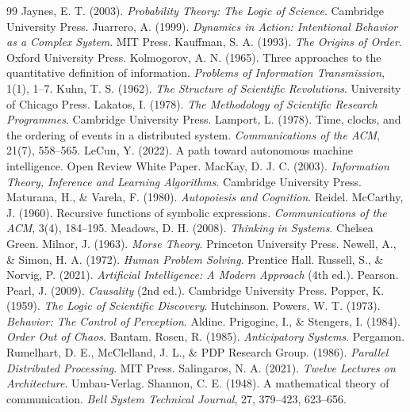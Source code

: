 \documentclass[11pt, oneside]{book}
\theoremstyle{definition}
\theoremstyle{remark}
\begin{document}
\begin{thebibliography}{99}
 Jaynes, E. T. (2003). \textit{Probability Theory: The Logic of Science}. Cambridge University Press.
 Juarrero, A. (1999). \textit{Dynamics in Action: Intentional Behavior as a Complex System}. MIT Press.
 Kauffman, S. A. (1993). \textit{The Origins of Order}. Oxford University Press.
 Kolmogorov, A. N. (1965). Three approaches to the quantitative definition of information. \textit{Problems of Information Transmission}, 1(1), 1--7.
 Kuhn, T. S. (1962). \textit{The Structure of Scientific Revolutions}. University of Chicago Press.
 Lakatos, I. (1978). \textit{The Methodology of Scientific Research Programmes}. Cambridge University Press.
 Lamport, L. (1978). Time, clocks, and the ordering of events in a distributed system. \textit{Communications of the ACM}, 21(7), 558--565.
 LeCun, Y. (2022). A path toward autonomous machine intelligence. Open Review White Paper.
 MacKay, D. J. C. (2003). \textit{Information Theory, Inference and Learning Algorithms}. Cambridge University Press.
 Maturana, H., \& Varela, F. (1980). \textit{Autopoiesis and Cognition}. Reidel.
 McCarthy, J. (1960). Recursive functions of symbolic expressions. \textit{Communications of the ACM}, 3(4), 184--195.
 Meadows, D. H. (2008). \textit{Thinking in Systems}. Chelsea Green.
 Milnor, J. (1963). \textit{Morse Theory}. Princeton University Press.
 Newell, A., \& Simon, H. A. (1972). \textit{Human Problem Solving}. Prentice Hall.
 Russell, S., \& Norvig, P. (2021). \textit{Artificial Intelligence: A Modern Approach} (4th ed.). Pearson.
 Pearl, J. (2009). \textit{Causality} (2nd ed.). Cambridge University Press.
 Popper, K. (1959). \textit{The Logic of Scientific Discovery}. Hutchinson.
 Powers, W. T. (1973). \textit{Behavior: The Control of Perception}. Aldine.
 Prigogine, I., \& Stengers, I. (1984). \textit{Order Out of Chaos}. Bantam.
 Rosen, R. (1985). \textit{Anticipatory Systems}. Pergamon.
 Rumelhart, D. E., McClelland, J. L., \& PDP Research Group. (1986). \textit{Parallel Distributed Processing}. MIT Press.
 Salingaros, N. A. (2021). \textit{Twelve Lectures on Architecture}. Umbau-Verlag.
 Shannon, C. E. (1948). A mathematical theory of communication. \textit{Bell System Technical Journal}, 27, 379--423, 623--656.

\end{thebibliography}
\end{document}
